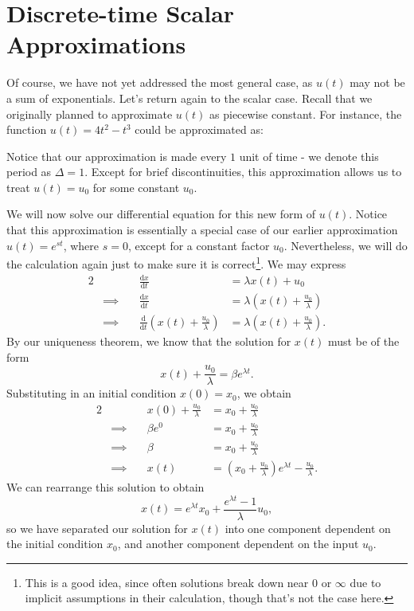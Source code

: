 \documentclass[letterpaper]{article}
\theoremstyle{remark}
\newcommand{\dx}{\mathrm{d}x}
\newcommand{\dt}{\mathrm{d}t}
\newcommand{\diff}{\mathrm{d}}
\newcommand{\eqn}[1]{\begin{alignat*}{2}#1\end{alignat*}}
\newcommand*{\thus}{&\implies\quad&}
\begin{document}
\section{Discrete-time Scalar Approximations}
Of course, we have not yet addressed the most general case, as $u(t)$ may not be a sum of exponentials. Let's return again to the scalar case. Recall that we originally planned to approximate $u(t)$ as piecewise constant. For instance, the function $u(t) = 4t^2 - t^3$ could be approximated as:
\begin{center}
\end{center}

Notice that our approximation is made every $1$ unit of time - we denote this period as $\Delta = 1$. Except for brief discontinuities, this approximation allows us to treat $u(t) = u_0$ for some constant $u_0$.

We will now solve our differential equation for this new form of $u(t)$. Notice that this approximation is essentially a special case of our earlier approximation $u(t) = e^{st}$, where $s = 0$, except for a constant factor $u_0$. Nevertheless, we will do the calculation again just to make sure it is correct\footnote{This is a good idea, since often solutions break down near $0$ or $\infty$ due to implicit assumptions in their calculation, though that's not the case here.}. We may express
\eqn{
    && \frac{\dx}{\dt} &= \lambda x(t) + u_0 \\
    \thus \frac{\dx}{\dt} &= \lambda \left(x(t) + \frac{u_0}{\lambda}\right) \\
    \thus \frac{\diff}{\dt}\left(x(t) + \frac{u_0}{\lambda}\right) &= \lambda \left(x(t) + \frac{u_0}{\lambda}\right).
}
By our uniqueness theorem, we know that the solution for $x(t)$ must be of the form
\[
    x(t) + \frac{u_0}{\lambda} = \beta e^{\lambda t}.
\]
Substituting in an initial condition $x(0) = x_0$, we obtain
\eqn{
    && x(0) + \frac{u_0}{\lambda} &= x_0 + \frac{u_0}{\lambda} \\
    \thus \beta e^{0} &= x_0 + \frac{u_0}{\lambda} \\
    \thus \beta &= x_0 + \frac{u_0}{\lambda} \\
    \thus x(t) &= \left(x_0 + \frac{u_0}{\lambda}\right)e^{\lambda t} - \frac{u_0}{\lambda}.
}
We can rearrange this solution to obtain
\[
    x(t) = e^{\lambda t}x_0 + \frac{e^{\lambda t} - 1}{\lambda}u_0,
\]
so we have separated our solution for $x(t)$ into one component dependent on the initial condition $x_0$, and another component dependent on the input $u_0$.
\end{document}
